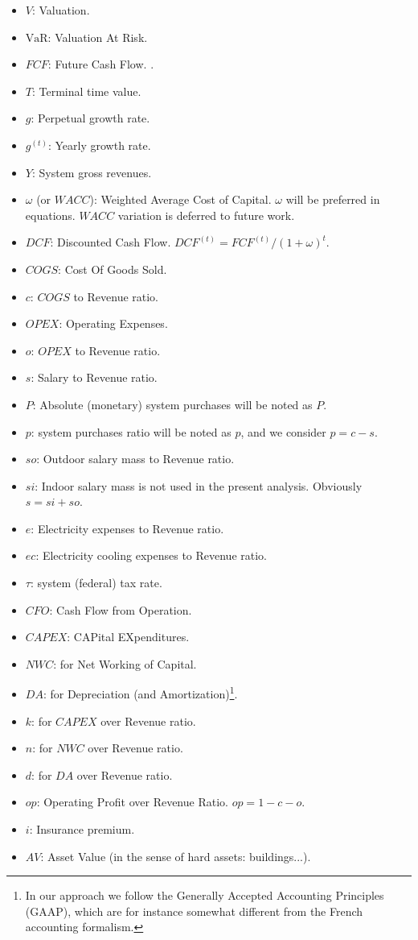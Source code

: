 \begin{itemize}
\item[•] $V$: Valuation.  
\item[•] $\text{VaR}$: Valuation At Risk.
\item[•] $FCF$: Future Cash Flow. .
\item[•] $T$: Terminal time value.
\item[•] $g$: Perpetual growth rate.
\item[•] $g^{(t)}$: Yearly growth rate.
\item[•] $Y$: System gross revenues. 
\item[•] $\omega$ (or $W\!ACC$): Weighted Average Cost of Capital. $\omega$ will be preferred in equations. $W\!ACC$ variation is deferred to future work.
\item[•] $DCF$: Discounted Cash Flow. $DCF^{(t)}=FCF^{(t)}/\left(1+\omega\right)^t$. 
\item[•] $COGS$: Cost Of Goods Sold.
\item[•] $c$: $COGS$ to Revenue ratio.
\item[•] $OPEX$: Operating Expenses.
\item[•] $o$: $OPEX$ to Revenue ratio.
\item[•] $s$: Salary to Revenue ratio. 
\item[•] $P$: Absolute (monetary) system purchases will be noted as $P$.
\item[•] $p$: system purchases ratio will be noted as $p$, and we consider $p=c-s$. 
\item[•] $so$: Outdoor salary mass to Revenue ratio.
\item[•] $si$: Indoor salary mass is not used in the present analysis. Obviously $s=si+so$.
\item[•] $e$: Electricity expenses to Revenue ratio.
\item[•] $ec$: Electricity cooling expenses to Revenue ratio.
\item[•] $\tau$: system (federal) tax rate.
\item[•] $CFO$: Cash Flow from Operation.
\item[•] $CAPEX$: CAPital EXpenditures.
\item[•] $NWC$: for Net Working of Capital. 
\item[•] $DA$: for Depreciation (and Amortization)\footnote{In our approach we follow the Generally Accepted Accounting Principles (GAAP)\cite{KPMG}, which are for instance somewhat different from the French accounting formalism.}. 
\item[•] $k$: for $CAPEX$ over Revenue ratio. 
\item[•] $n$: for $NWC$ over Revenue ratio. 
\item[•] $d$: for $DA$ over Revenue ratio. 
\item[•] $op$: Operating Profit over Revenue Ratio. $op=1-c-o$.
\item[•] $i$: Insurance premium.
\item[•] $AV$: Asset Value (in the sense of hard assets: buildings...).
\end{itemize}

